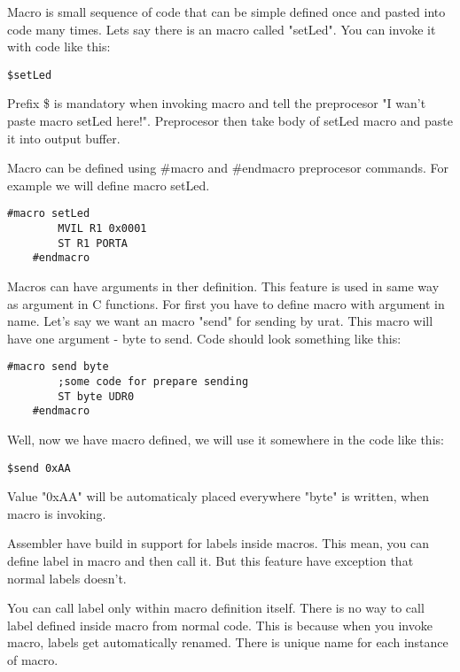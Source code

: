 Macro is small sequence of code that can be simple defined once and pasted into
code many times. Lets say there is an macro called "setLed". You can invoke it
with code like this:

\begin{lstlisting}[language={[x86masm]Assembler}, frame=single]
    $setLed
\end{lstlisting}

Prefix \$ is mandatory when invoking macro and tell the preprocesor "I wan't
paste macro setLed here!". Preprocesor then take body of setLed macro and paste
it into output buffer.

Macro can be defined using \#macro and \#endmacro preprocesor commands. For
example we will define macro setLed.

\begin{lstlisting}[language={[x86masm]Assembler}, frame=single]
    #macro setLed
        MVIL R1 0x0001
        ST R1 PORTA
    #endmacro
\end{lstlisting}

Macros can have arguments in ther definition. This feature is used in same way
as argument in C functions. For first you have to define macro with argument in
name. Let's say we want an macro "send" for sending by urat. This macro will
have one argument - byte to send. Code should look something like this:

\begin{lstlisting}[language={[x86masm]Assembler}, frame=single]
    #macro send byte
        ;some code for prepare sending
        ST byte UDR0
    #endmacro
\end{lstlisting}

Well, now we have macro defined, we will use it somewhere in the code like this:

\begin{lstlisting}[language={[x86masm]Assembler}, frame=single]
    $send 0xAA
\end{lstlisting}

Value "0xAA" will be automaticaly placed everywhere "byte" is written, when
macro is invoking.

Assembler have build in support for labels inside macros. This mean, you can
define label in macro and then call it. But this feature have exception that
normal labels doesn't.

You can call label only within macro definition itself. There is no way to call
label defined inside macro from normal code. This is because when you invoke
macro, labels get automatically renamed. There is unique name for each instance
of macro.

